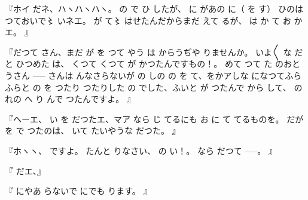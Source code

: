 『ホイ
だネ、ハヽハヽハヽ。
の
で
ひ
したが、
に
があの
に（
を
す）
ひのは
つておいで〻%
いネエ。
が
て〻%
はせたんだからまだ
えて
るが、
は
か
て
お
かエ。
』

『だつて
さん、まだ
が
を
つて
やう
は
からうぢや
りませんか。
いよ〳〵
な
だと
ひつめた
は、
くつて
くつて
が
かつたんですもの！。
めて
つて
た
のおとうさん \------
さんは
んなさらないが
の
しの
の
を
て、をかアしな
になつてふらふらと
の
を
つたり
つたりした
の
でした、ふいと
が
つたんで
から
して、
の
れの
へ
り
んで
つたんですよ。
』

『ヘーエ、
い
を
だつたエ、マア
なら
じ
てるにも
お
に
て
てるものを。
だが
を
で
つたのは、
いて
たいやうな
だつた。
』

『ホヽヽ、
ですよ。
たんと
りなさい、
の
い！。
なら
だつて \------。
』

『
だエ、』

『
にやあ
らないで
にでも
ります。
』

